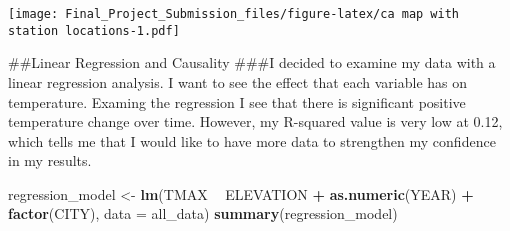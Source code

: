 \documentclass[]{article}
\newenvironment{Shaded}{\begin{snugshade}}{\end{snugshade}}
\newcommand{\DataTypeTok}[1]{\textcolor[rgb]{0.13,0.29,0.53}{#1}}
\newcommand{\KeywordTok}[1]{\textcolor[rgb]{0.13,0.29,0.53}{\textbf{#1}}}
\newcommand{\NormalTok}[1]{#1}
\newcommand{\OperatorTok}[1]{\textcolor[rgb]{0.81,0.36,0.00}{\textbf{#1}}}
\newcommand{\StringTok}[1]{\textcolor[rgb]{0.31,0.60,0.02}{#1}}
\begin{document}
\texttt{[image: Final\_Project\_Submission\_files/figure-latex/ca map with station locations-1.pdf]}

\#\#Linear Regression and Causality \#\#\#I decided to examine my data
with a linear regression analysis. I want to see the effect that each
variable has on temperature. Examing the regression I see that there is
significant positive temperature change over time. However, my R-squared
value is very low at 0.12, which tells me that I would like to have more
data to strengthen my confidence in my results.

\begin{Shaded}
\begin{Highlighting}[]
\NormalTok{regression_model <-}\StringTok{ }\KeywordTok{lm}\NormalTok{(TMAX }\OperatorTok{~}\StringTok{ }\NormalTok{ELEVATION }\OperatorTok{+}\StringTok{ }\KeywordTok{as.numeric}\NormalTok{(YEAR) }\OperatorTok{+}\StringTok{ }\KeywordTok{factor}\NormalTok{(CITY), }\DataTypeTok{data =}\NormalTok{ all_data)}
\KeywordTok{summary}\NormalTok{(regression_model)}
\end{Highlighting}
\end{Shaded}
\end{document}
